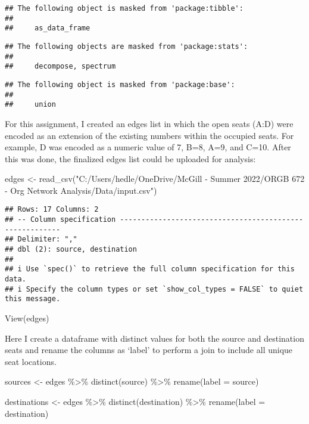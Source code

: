\documentclass[
]{article}
\newenvironment{Shaded}{\begin{snugshade}}{\end{snugshade}}
\newcommand{\AttributeTok}[1]{\textcolor[rgb]{0.77,0.63,0.00}{#1}}
\newcommand{\FunctionTok}[1]{\textcolor[rgb]{0.00,0.00,0.00}{#1}}
\newcommand{\NormalTok}[1]{#1}
\newcommand{\OtherTok}[1]{\textcolor[rgb]{0.56,0.35,0.01}{#1}}
\newcommand{\SpecialCharTok}[1]{\textcolor[rgb]{0.00,0.00,0.00}{#1}}
\newcommand{\StringTok}[1]{\textcolor[rgb]{0.31,0.60,0.02}{#1}}
\begin{document}
\begin{verbatim}
## The following object is masked from 'package:tibble':
## 
##     as_data_frame
\end{verbatim}

\begin{verbatim}
## The following objects are masked from 'package:stats':
## 
##     decompose, spectrum
\end{verbatim}

\begin{verbatim}
## The following object is masked from 'package:base':
## 
##     union
\end{verbatim}

For this assignment, I created an edges list in which the open seats
(A:D) were encoded as an extension of the existing numbers within the
occupied seats. For example, D was encoded as a numeric value of 7, B=8,
A=9, and C=10. After this was done, the finalized edges list could be
uploaded for analysis:

\begin{Shaded}
\begin{Highlighting}[]
\NormalTok{edges }\OtherTok{\textless{}{-}} \FunctionTok{read\_csv}\NormalTok{(}\StringTok{"C:/Users/hedle/OneDrive/McGill {-} Summer 2022/ORGB 672 {-} Org Network Analysis/Data/input.csv"}\NormalTok{)}
\end{Highlighting}
\end{Shaded}

\begin{verbatim}
## Rows: 17 Columns: 2
## -- Column specification --------------------------------------------------------
## Delimiter: ","
## dbl (2): source, destination
## 
## i Use `spec()` to retrieve the full column specification for this data.
## i Specify the column types or set `show_col_types = FALSE` to quiet this message.
\end{verbatim}

\begin{Shaded}
\begin{Highlighting}[]
\FunctionTok{View}\NormalTok{(edges)}
\end{Highlighting}
\end{Shaded}

Here I create a dataframe with distinct values for both the source and
destination seats and rename the columns as `label' to perform a join to
include all unique seat locations.

\begin{Shaded}
\begin{Highlighting}[]
\NormalTok{sources }\OtherTok{\textless{}{-}}\NormalTok{ edges }\SpecialCharTok{\%\textgreater{}\%}
  \FunctionTok{distinct}\NormalTok{(source) }\SpecialCharTok{\%\textgreater{}\%}
  \FunctionTok{rename}\NormalTok{(}\AttributeTok{label =}\NormalTok{ source)}

\NormalTok{destinations }\OtherTok{\textless{}{-}}\NormalTok{ edges }\SpecialCharTok{\%\textgreater{}\%}
  \FunctionTok{distinct}\NormalTok{(destination) }\SpecialCharTok{\%\textgreater{}\%}
  \FunctionTok{rename}\NormalTok{(}\AttributeTok{label =}\NormalTok{ destination)}
\end{Highlighting}
\end{Shaded}
\end{document}
